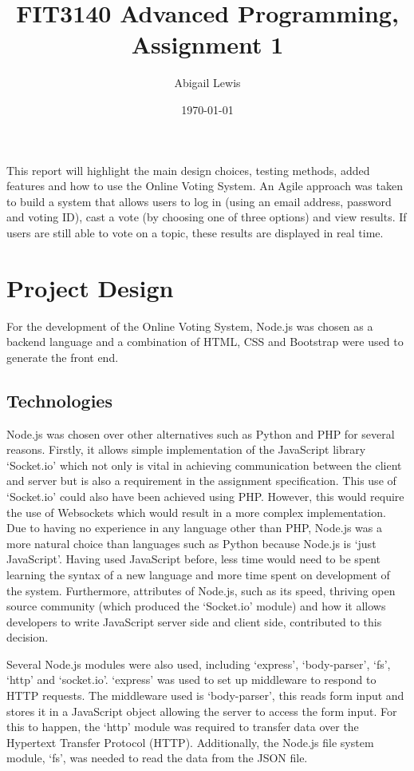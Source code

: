 \documentclass[11pt,oneside,a4paper]{article}
\title{FIT3140 Advanced Programming, Assignment 1}
\author{
	Abigail Lewis
}
\date{\today}
\begin{document}
	\maketitle
	
This report will highlight the main design choices, testing methods, added features and how to use the Online Voting System. An Agile approach was taken to build a system that allows users to log in (using an email address, password and voting ID), cast a vote (by choosing one of three options) and view results. If users are still able to vote on a topic, these results are displayed in real time.
	
\section*{Project Design}
For the development of the Online Voting System, Node.js was chosen as a backend language and a combination of HTML, CSS and Bootstrap were used to generate the front end.

\subsection*{Technologies}
Node.js was chosen over other alternatives such as Python and PHP for several reasons. Firstly, it allows simple implementation of the JavaScript library ‘Socket.io’ which not only is vital in achieving communication between the client and server but is also a requirement in the assignment specification. This use of ‘Socket.io’ could also have been achieved using PHP. However, this would require the use of Websockets which would result in a more complex implementation. Due to having no experience in any language other than PHP, Node.js was a more natural choice than languages such as Python because Node.js is ‘just JavaScript’. Having used JavaScript before, less time would need to be spent learning the syntax of a new language and more time spent on development of the system. Furthermore, attributes of Node.js, such as its speed, thriving open source community (which produced the ‘Socket.io’ module) and how it allows developers to write JavaScript server side and client side, contributed to this decision. 

Several Node.js modules were also used, including ‘express’, ‘body-parser’, ‘fs’, ‘http’ and ‘socket.io’. ‘express’ was used to set up middleware to respond to HTTP requests. The middleware used is ‘body-parser’, this reads form input and stores it in a JavaScript object allowing the server to access the form input. For this to happen, the ‘http’ module was required to transfer data over the Hypertext Transfer Protocol (HTTP). Additionally, the Node.js file system module, ‘fs’, was needed to read the data from the JSON file. 
\end{document}
